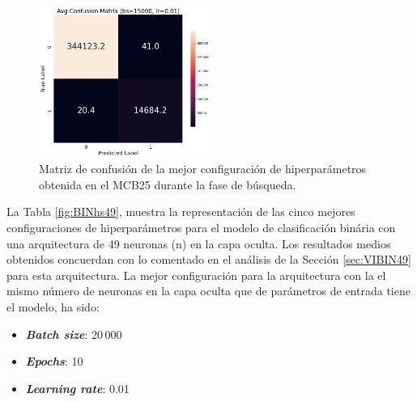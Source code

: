 \begin{figure}[H]
    \centering
    \includegraphics[width=0.5\textwidth]{./img/modelo/matrices_confusion/MC_ENT_MCB25.png}
    \caption{Matriz de confusión de la mejor configuración de hiperparámetros obtenida en el MCB25 durante la fase de búsqueda.}
    \label{fig:MC_ENT_MCB25}
\end{figure}




La Tabla \ref{fig:BINhs49}, muestra la representación de las cinco mejores configuraciones de hiperparámetros para el modelo de clasificación binária con una arquitectura de 49 neuronas (n) en la capa oculta. Los resultados medios obtenidos concuerdan con lo comentado en el análisis de la Sección \ref{sec:VIBIN49} para esta arquitectura. La mejor configuración para la arquitectura con la el mismo número de neuronas en la capa oculta que de parámetros de entrada tiene el modelo, ha sido:
\begin{itemize}
	\item \textbf{\textit{Batch size}}: 20\,000
	\item \textbf{\textit{Epochs}}: 10
	\item \textbf{\textit{Learning rate}}: 0.01
\end{itemize}

